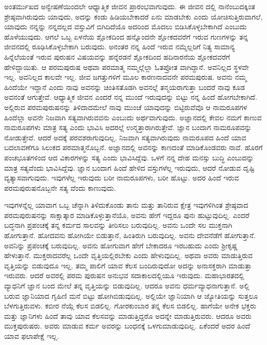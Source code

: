 ಅಂತರ್ಮುಖದ ಅನ್ವೇಷಣೆಯಿಂದಲೇ ಆಧ್ಯಾತ್ಮಿಕ ಜೀವನ ಪ್ರಾರಂಭವಾಗುವುದು. ಈ ಜೀವನ ದಲ್ಲಿ ನಾನೆಂಬುದಕ್ಕಿಂತ ಶ್ರೇಷ್ಠವಾಗಿರುವುದು ಯಾವುದು, ಅದನ್ನು ಕಂಡು ಹಿಡಿಯಬೇಕಾದರೆ ಏನು ಮಾಡಬೇಕು ಎಂದು ಯೋಚಿಸುತ್ತಿರುವಾಗಲೆ, ಯಾವುದು ನನ್ನನ್ನು ನನ್ನದಲ್ಲದ ವಸ್ತುವಿಗೆ ಬಿಗಿದಿದೆಯೊ ಅದರಿಂದ ಮೊದಲು ಬಿಡಿಸಿಕೊಳ್ಳಬೇಕಾಗಿದೆ ಎಂಬುದು ಹೊಳೆಯುವುದು. ಆಗಲೆ ಒಬ್ಬ ಏಳನೆಯ ಶ್ಲೋಕದಿಂದ ಹನ್ನೊಂದನೇ ಶ್ಲೋಕದವರೆಗೆ ಇರುವ ಗುಣಗಳನ್ನು ತನ್ನ ಜೀವನದಲ್ಲಿ ರೂಢಿಸಿಕೊಳ್ಳಬೇಕಾಗಿ ಬರುವುದು. ಅನಂತರ ನನ್ನ ಹಿಂದೆ ಇರುವ ನಮ್ಮೆಲ್ಲರಿಗೆ ನಿತ್ಯ ಸಾಮಾನ್ಯ ಹಿನ್ನೆಲೆಯಂತೆ ಇರುವ ಪುರುಷನ ವಿಷಯವನ್ನು ಹನ್ನೆರಡನೆ ಶ್ಲೋಕದಿಂದ ಹದಿನಾರನೆಯ ಶ್ಲೋಕದವರೆಗೆ ಹೇಳಿದ್ದಾಯಿತು. ಆ ಪರಮಪುರುಷ ಅಥವಾ ಪರಮಾತ್ಮ ನಮ್ಮಲ್ಲೆಲ್ಲಾ ಓತಪ್ರೋತ ವಾಗಿದ್ದಾನೆ. ಅವನಿಲ್ಲದ ಸ್ಥಳವೇ ಇಲ್ಲ. ಅವನಿಲ್ಲದ ಕಾಲವೇ ಇಲ್ಲ. ಜೀವ ಜಗತ್ತುಗಳಿಗೆ ಮೂಲ ಕಾರಣನಾದವನೇ ಪರಮಪುರುಷ. ಅವನು ನಮ್ಮ ಹಿಂದೆಯೇ ಇದ್ದಾನೆ ಎಂದು ನಾವು ಅವನನ್ನು ಚಿಂತಿಸತೊಡಗಿ ಅವನಲ್ಲೆ ತನ್ಮಯರಾಗುತ್ತಾ ಬಂದರೆ ನಾವು ಕೂಡ ಅವನಂತೆ ಆಗುತ್ತೇವೆ. ಆಧ್ಯಾತ್ಮಿಕ ಜೀವನ ಎಂದರೆ ನನ್ನ ಮುಂದೆ ಇರುವುದನ್ನು ಬಿಟ್ಟು ನನ್ನ ಹಿಂದೆ ಹೋಗಬೇಕಾಗಿದೆ. ಅಲ್ಲಿರುವ ಪರಮಪುರುಷನನ್ನು ತಿಳಿದಾದಮೇಲೆ ನಾವು ಮುಂಚೆ ಯಾವುದನ್ನು ಬಿಟ್ಟಿರುವೆವೊ ಆ ನಾಮರೂಪಗಳ ಹಿಂದೆಲ್ಲಾ ಅವನೇ ನಿಜವಾಗಿ ಸತ್ಯವಾಗಿರುವವನು ಎಂಬುದು ಅರ್ಥವಾಗುವುದು. ಅಜ್ಞಾನದಲ್ಲಿ ಕೇವಲ ನಮಗೆ ಕಾಣುವ ನಾಮರೂಪಗಳು ಮಾತ್ರ ಸತ್ಯ ಎಂದು ಭಾವಿಸಿ ಅದರಲ್ಲೆ ಉನ್ಮತ್ತಾರಾಗಿರುತ್ತೇವೆ. ಜ್ಞಾನ ಬಂದಾಗ ನಾಮರೂಪವನ್ನು ನೋಡುತ್ತೇವೆ. ಆದರೆ ಅದಕ್ಕೆ ಪರವಶರಾಗುವುದಿಲ್ಲ. ನಿಜವಾಗಿ ಸತ್ಯವಾಗಿರುವುದು ನಾಮರೂಪದ ಹಿಂದೆ ಯಾವ ಬದಲಾವಣೆಗೂ ಸಿಲುಕದ ಪರಮಾತ್ಮನೊಬ್ಬನೆ. ಅಜ್ಞಾನದಲ್ಲಿ ಅವನನ್ನು ಕಾಣದಂತೆ ಮಾಡಿಕೊಂಡವರು ನಾವೆ. ಹೊರಗೆ ಪಂಚಭೂತಗಳಿಂದ ಆದ ವಿಕಾರಗಳನ್ನು ಸತ್ಯ ಎಂದು ಭಾವಿಸಿದ್ದೆವು. ಒಳಗೆ ನನ್ನ ದೇಹ ಮನಸ್ಸು ಬುದ್ಧಿ ಎಂಬುದನ್ನು ಮಾತ್ರ ಸತ್ಯವೆಂದು ಭಾವಿಸಿದ್ದೆವು. ಜ್ಞಾನ ಬಂದಾಗ ಹಿಂದೆ ಹೇಳಿದ ವಸ್ತುಗಳೆಲ್ಲ ಇರುವುದು, ಆದರೆ ನೋಡುವ ದೃಷ್ಟಿ ವ್ಯತ್ಯಾಸವಾಗುವುದು. ಇವುಗಳೆಲ್ಲ ಇರುವುದು ಬರೀ ನಾಮರೂಪಗಳು, ಬರೀ ಹೊಟ್ಟು. ಅದರ ಹಿಂದೆ ಇರುವ ಪರಮಪುರುಷನೊಬ್ಬನೇ ಸತ್ಯ ವೆಂದು ಕಾಣುವುದು.

ಇವುಗಳನ್ನೆಲ್ಲ ಯಾವಾಗ ಒಬ್ಬ ಚೆನ್ನಾಗಿ ತಿಳಿದುಕೊಂಡು ತಾನು ಮತ್ತು ತಾನಿರುವ ಕ್ಷೇತ್ರ ಇವುಗಳಿಗಿಂತ ಶ್ರೇಷ್ಠವಾದ ಪರಮಪುರುಷನನ್ನು ಸಾಕ್ಷಾತ್ಕಾರ ಮಾಡಿಕೊಳ್ಳುತ್ತಾನೆಯೊ, ಅವನು ಹೇಗೆ ಇದ್ದರೂ ಪುನಃ ಹುಟ್ಟುವುದಿಲ್ಲ. ಎಂದರೆ ಬದ್ಧನಾಗಿ ಪ್ರಪಂಚಕ್ಕೆ ತನ್ನ ಕರ್ಮದ ಸಾಲವನ್ನು ತೀರಿಸಲು ಬರುವುದಿಲ್ಲ. ಅವನು ಒಂದೇ ಸಲ ಮುಕ್ತನಾಗಿ ಹೋಗುತ್ತಾನೆ. ಹೋದವನು ಹೋಗಿಯೇ ಬಿಡುತ್ತಾನೆ, ಹಿಂತಿರುಗಿ ಬರುವುದಿಲ್ಲ. ಅವನು ದೇವನೆಡೆಗೆ ಹೋಗುತ್ತಾನೆ. ಅವನಿನ್ನು ಪ್ರಪಂಚಕ್ಕೆ ಬರುವುದಿಲ್ಲ. ಅವನು ಹೋಗುವಾಗ ಹೇಗೆ ಬೇಕಾದರೂ ಇರಬಹುದು ಎಂದು ಶ‍್ರೀಕೃಷ್ಣ ಹೇಳುತ್ತಾನೆ. ಮುಕ್ತರಾದವರೆಲ್ಲ ಒಂದೇ ವೃತ್ತಿಯಲ್ಲಿರಬೇಕು ಎಂದು ಹೇಳುವುದಿಲ್ಲ. ಅಥವಾ ಅವರು ಮಾಡುತ್ತಿರುವ ವೃತ್ತಿಯನ್ನು ಬಿಡುವುದೂ ಇಲ್ಲ. ತಮ್ಮ ಪಾಲಿಗೆ ಯಾವ ಕೆಲಸ ಬಂದಿರುವುದೋ ಅದನ್ನು ಅನಾಸಕ್ತರಾಗಿ ಮಾಡುತ್ತಾ ಇರುವರು. ಆದರೆ ಅವರಲ್ಲಿ ಪರಮ ಪುರುಷನ ಅನುಭವ ಸದಾಕಾಲದಲ್ಲಿಯೂ ಇರುವುದು. ಮಹಾಭಾರತದಲ್ಲಿ ವ್ಯಾಧನಿಗೆ ಜ್ಞಾನ ಬಂದ ಮೇಲೆ ತನ್ನ ವೃತ್ತಿಯನ್ನು ಬಿಡುವುದಿಲ್ಲ. ಆದರೂ ಅವನು ಧರ್ಮವ್ಯಾಧನಾಗುತ್ತಾನೆ. ಅಲ್ಲಿ ಬರುವ ಜ್ಞಾನಿಯಾದ ಗೃಹಿಣಿ ಮನೆ ಬಿಟ್ಟು ಹೋಗಿಬಿಡುವುದಿಲ್ಲ. ಅಲ್ಲಿಯೇ ಜ್ಞಾನಿಯಾಗಿ ಆ ಜ್ಯೋತಿಯನ್ನು ಸುತ್ತಲೂ ಬೆಳಗುತ್ತಿರುವಳು. ಕಬೀರ ನೆಯ್ಗೆ ಕೆಲಸ ಬಿಡಲಿಲ್ಲ. ಗೋರಕುಂಬಾರ ತನ್ನ ಕೆಲಸ ಬಿಡಲಿಲ್ಲ. ಹಾಗೆಯೇ ಅನೇಕ ಭಕ್ತರು ಮತ್ತು ಜ್ಞಾನಿಗಳು ಹಿಂದೆ ತಾವು ಯಾವ ಕೆಲಸವನ್ನು ಮಾಡುತ್ತಿದ್ದರೊ ಅದನ್ನೇ ಮಾಡುತ್ತಿರುವರು. ಆದರೂ ಅವರು ಮುಕ್ತಪುರುಷರು. ಅವರು ಮಾಡುವ ಕರ್ಮ ಅವರನ್ನು ಬಂಧನಕ್ಕೆ ಒಳಗುಮಾಡುವುದಿಲ್ಲ. ಏಕೆಂದರೆ ಅದರ ಹಿಂದೆ ಯಾವ ಫಲಾಪೇಕ್ಷೆ ಇಲ್ಲ.

